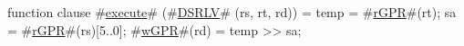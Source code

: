 function clause #\hyperref[zexecute]{execute}# (#\hyperref[zDSRLV]{DSRLV}# (rs, rt, rd)) =
  {
    temp = #\hyperref[zrGPR]{rGPR}#(rt);
    sa = #\hyperref[zrGPR]{rGPR}#(rs)[5..0];
    #\hyperref[zwGPR]{wGPR}#(rd) = temp >> sa;
  }
